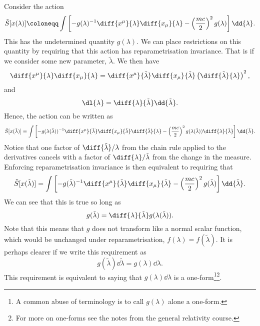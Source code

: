 Consider the action
\begin{equation}
    \tilde{S}[x(\lambda)] \coloneqq \int \left[ -g(\lambda)^{-1} \diff{x^\mu}{\lambda} \diff{x_\mu}{\lambda} - \left( \frac{mc}{2} \right)^2 g(\lambda) \right] \dd{\lambda}.
\end{equation}
This has the undetermined quantity \(g(\lambda)\).
We can place restrictions on this quantity by requiring that this action has reparametrisation invariance.
That is if we consider some new parameter, \(\tilde{\lambda}\).
We then have
\begin{equation}
    \diff{x^\mu}{\lambda} \diff{x_\mu}{\lambda} = \diff{x^\mu}{\tilde{\lambda}} \diff{x_\mu}{\tilde{\lambda}} \left( \diff{\tilde{\lambda}}{\lambda} \right)^2,
\end{equation}
and
\begin{equation}
    \dl{\lambda} = \diff{\lambda}{\tilde{\lambda}}\dd{\tilde{\lambda}}.
\end{equation}
Hence, the action can be written as
\begin{equation}
    \tilde{S}[x(\tilde{\lambda})] = \int \left[ -g(\lambda(\tilde{\lambda}))^{-1} \diff{x^\mu}{\tilde{\lambda}} \diff{x_\mu}{\tilde{\lambda}} \diff{\tilde{\lambda}}{\lambda} - \left( \frac{mc}{2} \right)^2 g(\lambda(\tilde{\lambda})) \diff{\lambda}{\tilde{\lambda}} \right] \dd{\tilde{\lambda}}.
\end{equation}
Notice that one factor of \(\diff{\tilde{\lambda}}/{\lambda}\) from the chain rule applied to the derivatives cancels with a factor of \(\diff{\lambda}/{\tilde{\lambda}}\) from the change in the measure.
Enforcing reparametrisation invariance is then equivalent to requiring that
\begin{equation}
    \tilde{S}[x(\tilde{\lambda})] = \int\left[ -g(\tilde{\lambda})^{-1} \diff{x^\mu}{\tilde{\lambda}} \diff{x_\mu}{\tilde{\lambda}} - \left( \frac{mc}{2} \right)^2 g(\tilde{\lambda}) \right] \dd{\tilde{\lambda}}.
\end{equation}
We can see that this is true so long as
\begin{equation}
    g(\tilde{\lambda}) = \diff{\lambda}{\tilde{\lambda}} g(\lambda(\tilde{\lambda})).
\end{equation}
Note that this means that \(g\) does not transform like a normal scalar function, which would be unchanged under reparametrisation, \(f(\lambda) = f(\tilde{\lambda})\).
It is perhaps clearer if we write this requirement as
\begin{equation}
    g(\tilde{\lambda})\dd{\tilde{\lambda}} = g(\lambda) \dd{\lambda}.
\end{equation}
This requirement is equivalent to saying that \(g(\lambda)\dd{\lambda}\) is a one-form\footnote{A common abuse of terminology is to call \(g(\lambda)\) alone a one-form.}\footnote{For more on one-forms see the notes from the general relativity course.}.

